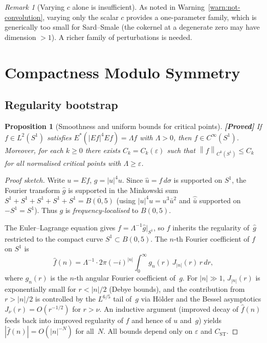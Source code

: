 \documentclass[12pt]{article}
\newtheorem{proposition}[theorem]{Proposition}
\theoremstyle{definition}
\theoremstyle{remark}
\newtheorem{remark}[theorem]{Remark}
\newcommand{\wh}{\widehat}
\newcommand{\norm}[1]{\left\|#1\right\|}
\newcommand{\proven}{\textbf{\color{teal}[Proved]}}
\begin{document}
\begin{remark}[Varying $c$ alone is insufficient]
  As noted in Warning~\ref{warn:not-convolution}, varying only the scalar
  $c$ provides a one-parameter family, which is generically too small for
  Sard--Smale (the cokernel at a degenerate zero may have dimension
  $>1$).  A richer family of perturbations is needed.
\end{remark}

\section{Compactness Modulo Symmetry}
\label{sec:compactness}

\subsection{Regularity bootstrap}

\begin{proposition}[Smoothness and uniform bounds for critical points]
  \label{prop:bootstrap}
  \proven\quad
  If $f\in L^2(S^1)$ satisfies $E^*(|Ef|^4Ef)=\Lambda f$ with
  $\Lambda>0$, then $f\in C^\infty(S^1)$.  Moreover, for each
  $k\geq 0$ there exists $C_k=C_k(\varepsilon)$ such that
  $\norm{f}_{C^k(S^1)}\leq C_k$ for all normalised critical points
  with $\Lambda\geq\varepsilon$.
\end{proposition}

\begin{proof}[Proof sketch]
  Write $u=Ef$, $g=|u|^4u$.  Since $\wh u=f\,d\sigma$ is supported on
  $S^1$, the Fourier transform $\wh g$ is supported in the Minkowski sum
  $S^1+S^1+S^1+S^1+S^1=\overline{B(0,5)}$ (using $|u|^4u=u^3\bar u^2$
  and $\wh{\bar u}$ supported on $-S^1=S^1$).  Thus $g$ is
  \emph{frequency-localised} to $B(0,5)$.

  The Euler--Lagrange equation gives $f=\Lambda^{-1}\wh g\big|_{S^1}$,
  so $f$ inherits the regularity of~$\wh g$ restricted to the compact
  curve $S^1\subset B(0,5)$.  The $n$-th Fourier coefficient of $f$
  on $S^1$ is
  \begin{equation}\label{eq:fourier-bootstrap}
    \wh f(n)
    = \Lambda^{-1}\cdot 2\pi(-i)^{|n|}
      \int_0^\infty g_n(r)\,J_{|n|}(r)\,r\,dr,
  \end{equation}
  where $g_n(r)$ is the $n$-th angular Fourier coefficient of~$g$.
  For $|n|\gg 1$, $J_{|n|}(r)$ is exponentially small for $r<|n|/2$
  (Debye bounds), and the contribution from $r>|n|/2$ is controlled by
  the $L^{6/5}$ tail of~$g$ via H\"older and the Bessel asymptotics
  $J_\nu(r)=O(r^{-1/2})$ for $r>\nu$.  An inductive argument (improved
  decay of $\wh f(n)$ feeds back into improved regularity of $f$ and
  hence of $u$ and~$g$) yields $|\wh f(n)|=O(|n|^{-N})$ for all~$N$.
  All bounds depend only on $\varepsilon$ and $C_{\mathrm{ST}}$.
\end{proof}
\end{document}
